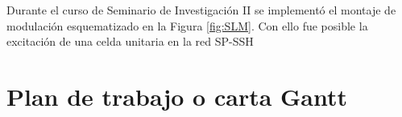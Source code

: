 \documentclass{article}
\begin{document}
Durante el curso de Seminario de Investigación II se implementó el montaje de modulación esquematizado en la Figura \ref{fig:SLM}. Con ello fue posible la excitación de una celda unitaria en la red SP-SSH

\section{Plan de trabajo o carta Gantt}




\end{document}
